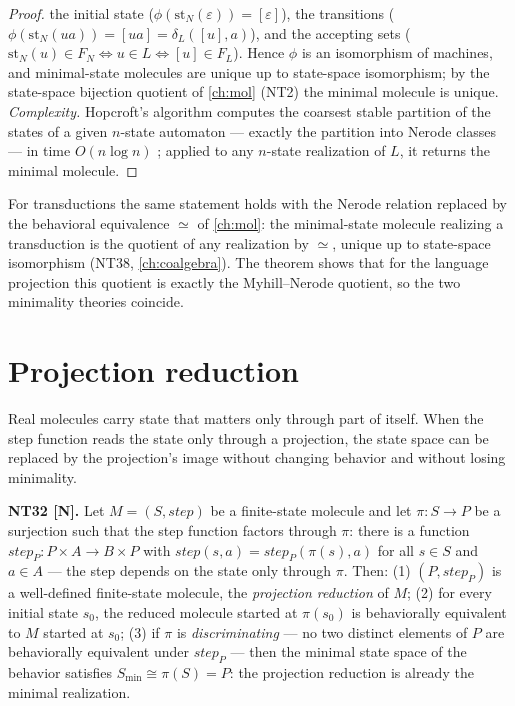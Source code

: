 \begin{proof}
the initial state ($\phi(\mathrm{st}_N(\varepsilon)) = [\varepsilon]$), the
transitions ($\phi(\mathrm{st}_N(ua)) = [ua] = \delta_L([u], a)$), and the
accepting sets ($\mathrm{st}_N(u) \in F_N \Leftrightarrow u \in L
\Leftrightarrow [u] \in F_L$). Hence $\phi$ is an isomorphism of machines, and
minimal-state molecules are unique up to state-space isomorphism; by the
state-space bijection quotient of \autoref{ch:mol} (NT2) the minimal molecule
is unique. \emph{Complexity.} Hopcroft's algorithm computes the coarsest
stable partition of the states of a given $n$-state automaton --- exactly the
partition into Nerode classes --- in time $O(n \log n)$ \cite{hopcroft};
applied to any $n$-state realization of $L$, it returns the minimal molecule.
\end{proof}

\begin{remark}
For transductions the same statement holds with the Nerode relation replaced
by the behavioral equivalence $\simeq$ of \autoref{ch:mol}: the minimal-state
molecule realizing a transduction is the quotient of any realization by
$\simeq$, unique up to state-space isomorphism (NT38, \autoref{ch:coalgebra}).
The theorem shows that for the language projection this quotient is exactly
the Myhill--Nerode quotient, so the two minimality theories coincide.
\end{remark}

\section{Projection reduction}\label{sec:enrich-projection}

Real molecules carry state that matters only through part of itself. When the
step function reads the state only through a projection, the state space can
be replaced by the projection's image without changing behavior and without
losing minimality.

\begin{theorem}\label{nt:32}
\textbf{NT32 [N].} Let $M = (S, \mathit{step})$ be a finite-state molecule and
let $\pi \colon S \to P$ be a surjection such that the step function factors
through $\pi$: there is a function
$\mathit{step}_{P} \colon P \times A \to B \times P$ with
$\mathit{step}(s, a) = \mathit{step}_{P}(\pi(s), a)$ for all $s \in S$ and
$a \in A$ --- the step depends on the state only through $\pi$. Then:
(1) $(P, \mathit{step}_{P})$ is a well-defined finite-state molecule, the
\emph{projection reduction} of $M$;
(2) for every initial state $s_0$, the reduced molecule started at
$\pi(s_0)$ is behaviorally equivalent to $M$ started at $s_0$;
(3) if $\pi$ is \emph{discriminating} --- no two distinct elements of $P$ are
behaviorally equivalent under $\mathit{step}_{P}$ --- then the minimal state
space of the behavior satisfies $S_{\min} \cong \pi(S) = P$: the projection
reduction is already the minimal realization.
\end{theorem}

